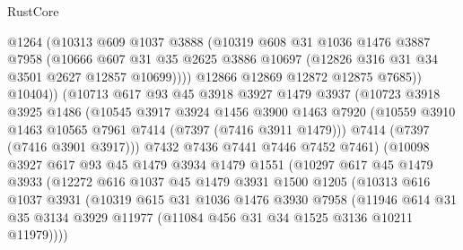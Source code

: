 \begin{lexlean}{RustCore}
\begin{coremodule}
                    @1264
                    (@10313
                      @609
                      @1037
                      @3888
                      (@10319
                        @608
                        @31
                        @1036
                        @1476
                        @3887
                        @7958
                        (@10666
                          @607
                          @31
                          @35
                          @2625
                          @3886
                          @10697
                          (@12826 @316 @31 @34 @3501 @2627 @12857 @10699))))
                    @12866
                    @12869
                    @12872
                    @12875
                    @7685))
                @10404))
            (@10713
              @617
              @93
              @45
              @3918
              @3927
              @1479
              @3937
              (@10723
                @3918
                @3925
                @1486
                (@10545
                  @3917
                  @3924
                  @1456
                  @3900
                  @1463
                  @7920
                  (@10559 @3910 @1463 @10565 @7961 @7414 (@7397 (@7416 @3911 @1479)))
                  @7414
                  (@7397 (@7416 @3901 @3917)))
                @7432
                @7436
                @7441
                @7446
                @7452
                @7461)
              (@10098
                @3927
                @617
                @93
                @45
                @1479
                @3934
                @1479
                @1551
                (@10297
                  @617
                  @45
                  @1479
                  @3933
                  (@12272
                    @616
                    @1037
                    @45
                    @1479
                    @3931
                    @1500
                    @1205
                    (@10313
                      @616
                      @1037
                      @3931
                      (@10319
                        @615
                        @31
                        @1036
                        @1476
                        @3930
                        @7958
                        (@11946
                          @614
                          @31
                          @35
                          @3134
                          @3929
                          @11977
                          (@11084 @456 @31 @34 @1525 @3136 @10211 @11979))))

\end{coremodule}
\end{lexlean}
